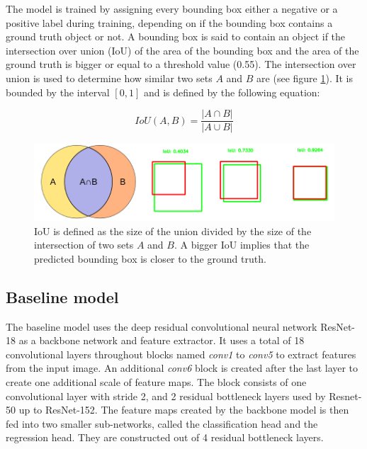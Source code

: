 \documentclass[a4paper, twoside]{article}
\begin{document}
The model is trained by assigning every bounding box either a negative or a positive label during training, depending on if the bounding box contains a ground truth object or not. A bounding box is said to contain an object if the intersection over union (IoU) \cite{iou} of the area of the bounding box and the area of the ground truth is bigger or equal to a threshold value (0.55). The intersection over union is used to determine how similar two sets $A$ and $B$ are (see figure \ref{figiou}). It is bounded by the interval $[0,1]$ and is defined by the following equation: 

\begin{equation}\label{eqiou}
IoU(A, B)=\frac{|A \cap B|}{|A \cup B|}
\end{equation}

\begin{figure}[h]
	\centering
  		\includegraphics[scale=0.5]{iou.png}
  	\caption{IoU \cite{iou} is defined as the size of the union divided by the size of the intersection of two sets $A$ and $B$. A bigger IoU implies that the predicted bounding box is closer to the ground truth. } \label{figiou}
\end{figure}

\subsection{Baseline model}
The baseline model uses the deep residual convolutional neural network ResNet-18 \cite{resnet} as a backbone network and feature extractor. It uses a total of 18 convolutional layers throughout blocks named \textit{conv1} to \textit{conv5} to extract features from the input image. An additional \textit{conv6} block is created after the last layer to create one additional scale of feature maps. The block consists of one convolutional layer with stride 2, and 2 residual bottleneck layers used by Resnet-50 up to ResNet-152. The feature maps created by the backbone model is then fed into two smaller sub-networks, called the classification head and the regression head. They are constructed out of 4 residual bottleneck layers.
\end{document}
